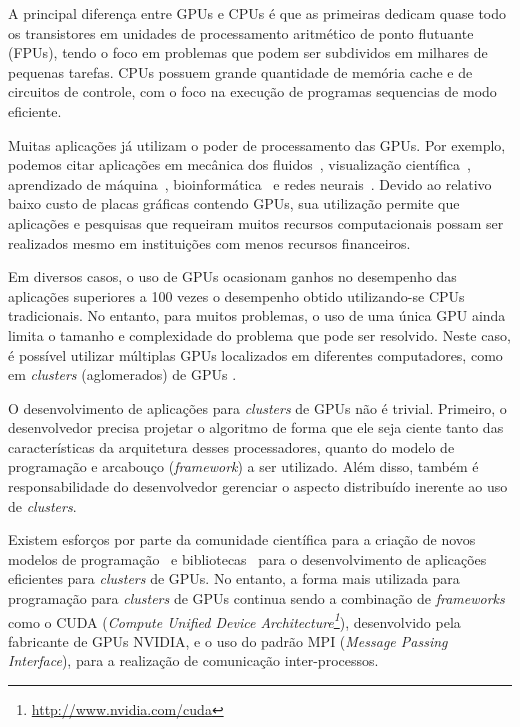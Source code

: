 A principal diferença entre GPUs e CPUs é que as primeiras dedicam quase todo os
transistores em unidades de processamento aritmético de ponto flutuante (FPUs),
tendo o foco em problemas que podem ser subdividos em milhares de pequenas
tarefas. CPUs possuem grande quantidade de memória cache e de circuitos de
controle, com o foco na execução de programas sequencias de modo eficiente.

Muitas aplicações já utilizam o poder de processamento das GPUs. Por exemplo,
podemos citar aplicações em mecânica dos fluidos~\cite{fluido}, visualização
científica~\cite{visualizacao}, aprendizado de máquina~\cite{Aprendizado},
bioinformática~\cite{rozante} e redes neurais~\cite{siang}. Devido ao relativo
baixo custo de placas gráficas contendo GPUs, sua utilização permite que
aplicações e pesquisas que requeiram muitos recursos computacionais possam ser
realizados mesmo em instituições com menos recursos financeiros.

Em diversos casos, o uso de GPUs ocasionam ganhos no desempenho das aplicações
superiores a 100 vezes o desempenho obtido utilizando-se CPUs tradicionais. No
entanto, para muitos problemas, o uso de uma única GPU ainda limita o tamanho e
complexidade do problema que pode ser resolvido. Neste caso, é possível utilizar
múltiplas GPUs localizados em diferentes computadores, como em \textit{clusters}
(aglomerados) de GPUs \cite{raphael, cluster}.

O desenvolvimento de aplicações para \textit{clusters} de GPUs não é
trivial. Primeiro, o desenvolvedor precisa projetar o algoritmo de forma que ele
seja ciente tanto das características da arquitetura desses processadores,
quanto do modelo de programação e arcabouço (\textit{framework}) a ser
utilizado. Além disso, também é responsabilidade do desenvolvedor gerenciar o
aspecto distribuído inerente ao uso de \textit{clusters}.

Existem esforços por parte da comunidade científica para a criação de novos
modelos de programação~\cite{appCientificas, wave} e bibliotecas~\cite{snucl,
  Flat} para o desenvolvimento de aplicações eficientes para \textit{clusters}
de GPUs. No entanto, a forma mais utilizada para programação para
\textit{clusters} de GPUs continua sendo a combinação de \textit{frameworks}
como o CUDA (\textit{Compute Unified Device
  Architecture\footnote{\url{http://www.nvidia.com/cuda}}}), desenvolvido pela
fabricante de GPUs NVIDIA, e o uso do padrão MPI (\textit{Message Passing
  Interface}), para a realização de comunicação inter-processos.

